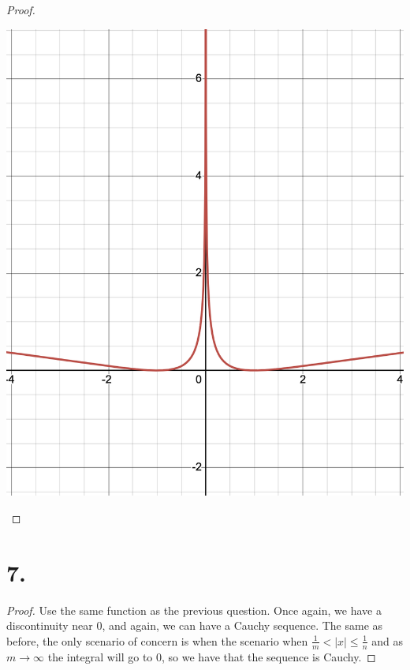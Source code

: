 \documentclass{article}
\begin{document}
\begin{proof}
\begin{center}
\includegraphics[scale=0.3]{Graph}
\end{center}
\end{proof}
\section*{7.}
\begin{proof}
Use the same function as the previous question. Once again, we have a discontinuity near $0$, and again, we can have a Cauchy sequence. The same as before, the only scenario of concern is when the scenario when $\frac{1}{m} < |x| \leq \frac{1}{n}$ and as $m \to \infty$ the integral will go to $0$, so we have that the sequence is Cauchy. 
\end{proof}
\end{document}
